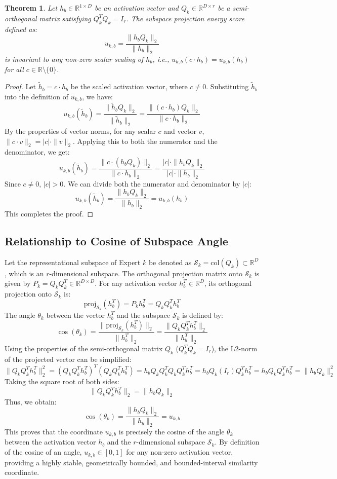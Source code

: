 \documentclass{article}
\theoremstyle{plain}
\newtheorem{theorem}{Theorem}[section]
\theoremstyle{definition}
\theoremstyle{remark}
\begin{document}
\begin{theorem}
Let $h_b \in \mathbb{R}^{1 \times D}$ be an activation vector and $Q_k \in \mathbb{R}^{D \times r}$ be a semi-orthogonal matrix satisfying $Q_k^T Q_k = I_r$. The subspace projection energy score defined as:
$$u_{k, b} = \frac{\| h_b Q_k \|_2}{\| h_b \|_2}$$
is invariant to any non-zero scalar scaling of $h_b$, i.e., $u_{k, b}(c \cdot h_b) = u_{k, b}(h_b)$ for all $c \in \mathbb{R} \setminus \{0\}$.
\end{theorem}

\begin{proof}
Let $\tilde{h}_b = c \cdot h_b$ be the scaled activation vector, where $c \neq 0$. Substituting $\tilde{h}_b$ into the definition of $u_{k, b}$, we have:
$$u_{k, b}(\tilde{h}_b) = \frac{\| \tilde{h}_b Q_k \|_2}{\| \tilde{h}_b \|_2} = \frac{\| (c \cdot h_b) Q_k \|_2}{\| c \cdot h_b \|_2}$$
By the properties of vector norms, for any scalar $c$ and vector $v$, $\| c \cdot v \|_2 = |c| \cdot \| v \|_2$. Applying this to both the numerator and the denominator, we get:
$$u_{k, b}(\tilde{h}_b) = \frac{\| c \cdot (h_b Q_k) \|_2}{\| c \cdot h_b \|_2} = \frac{|c| \cdot \| h_b Q_k \|_2}{|c| \cdot \| h_b \|_2}$$
Since $c \neq 0$, $|c| > 0$. We can divide both the numerator and denominator by $|c|$:
$$u_{k, b}(\tilde{h}_b) = \frac{\| h_b Q_k \|_2}{\| h_b \|_2} = u_{k, b}(h_b)$$
This completes the proof.
\end{proof}

\subsection{Relationship to Cosine of Subspace Angle}
\label{subsec:subspace_angle}

Let the representational subspace of Expert $k$ be denoted as $\mathcal{S}_k = \text{col}(Q_k) \subset \mathbb{R}^D$, which is an $r$-dimensional subspace. The orthogonal projection matrix onto $\mathcal{S}_k$ is given by $P_k = Q_k Q_k^T \in \mathbb{R}^{D \times D}$.
For any activation vector $h_b^T \in \mathbb{R}^D$, its orthogonal projection onto $\mathcal{S}_k$ is:
$$\text{proj}_{\mathcal{S}_k}(h_b^T) = P_k h_b^T = Q_k Q_k^T h_b^T$$
The angle $\theta_k$ between the vector $h_b^T$ and the subspace $\mathcal{S}_k$ is defined by:
$$\cos(\theta_k) = \frac{\| \text{proj}_{\mathcal{S}_k}(h_b^T) \|_2}{\| h_b^T \|_2} = \frac{\| Q_k Q_k^T h_b^T \|_2}{\| h_b^T \|_2}$$
Using the properties of the semi-orthogonal matrix $Q_k$ ($Q_k^T Q_k = I_r$), the L2-norm of the projected vector can be simplified:
$$\| Q_k Q_k^T h_b^T \|_2^2 = (Q_k Q_k^T h_b^T)^T (Q_k Q_k^T h_b^T) = h_b Q_k Q_k^T Q_k Q_k^T h_b^T = h_b Q_k (I_r) Q_k^T h_b^T = h_b Q_k Q_k^T h_b^T = \| h_b Q_k \|_2^2$$
Taking the square root of both sides:
$$\| Q_k Q_k^T h_b^T \|_2 = \| h_b Q_k \|_2$$
Thus, we obtain:
$$\cos(\theta_k) = \frac{\| h_b Q_k \|_2}{\| h_b \|_2} = u_{k, b}$$
This proves that the coordinate $u_{k, b}$ is precisely the cosine of the angle $\theta_k$ between the activation vector $h_b$ and the $r$-dimensional subspace $\mathcal{S}_k$. By definition of the cosine of an angle, $u_{k, b} \in [0, 1]$ for any non-zero activation vector, providing a highly stable, geometrically bounded, and bounded-interval similarity coordinate.

\end{document}
